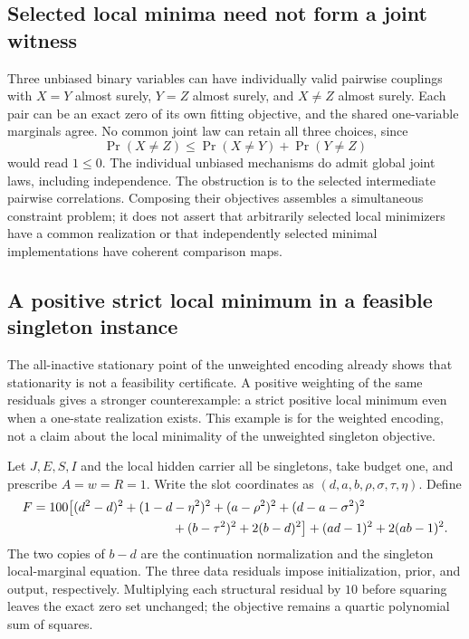 \documentclass[11pt]{article}
\theoremstyle{remark}
\begin{document}
\subsection{Selected local minima need not form a joint witness}
Three unbiased binary variables can have individually valid pairwise couplings with $X=Y$ almost surely, $Y=Z$ almost surely, and $X\ne Z$ almost surely. Each pair can be an exact zero of its own fitting objective, and the shared one-variable marginals agree. No common joint law can retain all three choices, since
\[
 \Pr(X\ne Z)\le\Pr(X\ne Y)+\Pr(Y\ne Z)
\]
would read $1\le0$. The individual unbiased mechanisms do admit global joint laws, including independence. The obstruction is to the selected intermediate pairwise correlations. Composing their objectives assembles a simultaneous constraint problem; it does not assert that arbitrarily selected local minimizers have a common realization or that independently selected minimal implementations have coherent comparison maps.

\subsection{A positive strict local minimum in a feasible singleton instance}

The all-inactive stationary point of the unweighted encoding already shows
that stationarity is not a feasibility certificate.  A positive weighting
of the same residuals gives a stronger counterexample: a strict positive
local minimum even when a one-state realization exists.  This example is
for the weighted encoding, not a claim about the local minimality of the
unweighted singleton objective.

Let $J,E,S,I$ and the local hidden carrier all be singletons, take budget
one, and prescribe $A=w=R=1$.  Write the slot coordinates as
$(d,a,b,\rho,\sigma,\tau,\eta)$.  Define
\begin{align*}
 F={}&100\bigl[(d^2-d)^2+(1-d-\eta^2)^2
 +(a-\rho^2)^2+(d-a-\sigma^2)^2\\
 &\hspace{34mm} +(b-\tau^2)^2+2(b-d)^2\bigr]
 +(ad-1)^2+2(ab-1)^2.
\end{align*}
The two copies of $b-d$ are the continuation normalization and the
singleton local-marginal equation.  The three data residuals impose
initialization, prior, and output, respectively.  Multiplying each
structural residual by $10$ before squaring leaves the exact zero set
unchanged; the objective remains a quartic polynomial sum of squares.
\end{document}
